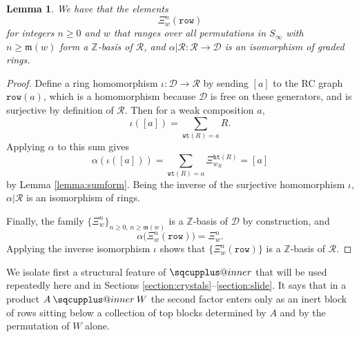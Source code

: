 \documentclass{amsart}
\makeatletter
\newcommand{\sqcupplus@inner}[2]{%
  \vcenter{\hbox{\ooalign{%
    \hfil$\m@th#1\sqcup$\hfil\cr
    \hfil\raisebox{0.15ex}{$\m@th#1\scriptscriptstyle+$}\hfil\cr
  }}}%
}
\newcommand{\sqcupplus}{\mathbin{\mathpalette\sqcupplus@inner\relax}}
\newtheorem{lemma}{Lemma}[subsection]
\theoremstyle{definition}
\theoremstyle{remark}
\numberwithin{equation}{subsection}
\newcommand{\wof}[1]{w_{#1}}
\newcommand{\wtt}{\mathtt{wt}}
\newcommand{\hr}{\mathtt{ht}}
\newcommand{\dsch}{\ensuremath{\Xi}}
\newcommand{\dcoma}{\mathcal{D}}
\newcommand{\maxd}{\mathfrak{m}}
\makeatother
\begin{document}
\begin{lemma} \label{lemma:schubertrow}
We have that the elements
$$\dsch_w^n(\mathtt{row})$$
for integers $n\geq 0$ and $w$ that ranges over all permutations in $S_\infty$ with $n\geq \maxd(w)$ form a $\mathbb{Z}$-basis of $\mathcal{R}$, and $\alpha|\mathcal{R}:\mathcal{R}\to \dcoma$ is an isomorphism of graded rings.
\end{lemma}
\begin{proof}
Define a ring homomorphism $\iota:\dcoma\to \mathcal{R}$ by sending $[a]$ to the RC graph $\mathtt{row}(a)$, which is a homomorphism because $\dcoma$ is free on these generators, and is surjective by definition of $\mathcal{R}$. Then for a weak composition $a$,
$$\iota([a]) = \sum_{\wtt(R)=a} R.$$
Applying $\alpha$ to this sum gives
$$\alpha(\iota([a])) = \sum_{\wtt(R)=a}\dsch_{\wof{R}}^{\hr(R)} = [a]$$
by Lemma \ref{lemma:sumform}. Being the inverse of the surjective homomorphism $\iota$, $\alpha|\mathcal{R}$ is an isomorphism of rings.

Finally, the family $\{\dsch_w^n\}_{n\ge 0,\, n\ge\maxd(w)}$ is a $\mathbb{Z}$-basis of $\dcoma$ by construction, and
$$
\alpha\bigl(\dsch_w^n(\mathtt{row})\bigr)=\dsch_w^n.
$$
Applying the inverse isomorphism $\iota$ shows that $\{\dsch_w^n(\mathtt{row})\}$ is a $\mathbb{Z}$-basis of $\mathcal{R}$.
\end{proof}

We isolate first a structural feature of $\sqcupplus$ that will be used repeatedly here and in Sections \ref{section:crystals}--\ref{section:slide}. It says that in a product $A\sqcupplus W$ the second factor enters only as an inert block of rows sitting below a collection of top blocks determined by $A$ and by the permutation of $W$ alone.
\end{document}
